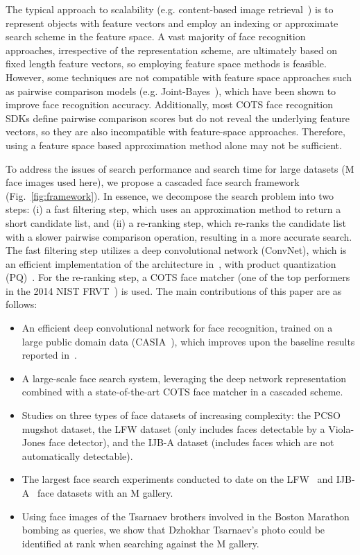 \documentclass[10pt,journal,compsoc]{IEEEtran}
\begin{document}
The typical approach to scalability (e.g. content-based image retrieval~\cite{faceretrieval:wu2010}) is to represent objects with feature vectors and employ an indexing or approximate search scheme in the feature space. A vast majority of face recognition approaches, irrespective of the representation scheme, are ultimately based on fixed length feature vectors, so employing feature space methods is feasible. However, some techniques are not compatible with feature space approaches such as pairwise comparison models (e.g. Joint-Bayes~\cite{ml:jointbayes}), which have been shown to improve face recognition accuracy.  Additionally, most COTS face recognition SDKs define pairwise comparison scores but do not reveal the underlying feature vectors, so they are also incompatible with feature-space approaches. Therefore, using a feature space based approximation method alone may not be sufficient.

To address the issues of search performance and search time for large datasets (M face images used here), we propose a cascaded face search framework (Fig.~\ref{fig:framework}). In essence, we decompose the search problem into two steps: (i) a fast filtering step, which uses an approximation method to return a short candidate list, and (ii) a re-ranking step, which re-ranks the candidate list with a slower pairwise comparison operation, resulting in a more accurate search. The fast filtering step utilizes a deep convolutional network (ConvNet), which is an efficient implementation of the architecture in~\cite{DB:CASIA}, with product quantization (PQ)~\cite{retrieval:pq}. For the re-ranking step, a COTS face matcher (one of the top performers in the 2014 NIST FRVT~\cite{fvrt:2014}) is used. The main contributions of this paper are as follows:
\begin{itemize}
  \item An efficient deep convolutional network for face recognition, trained on a large public domain data (CASIA~\cite{DB:CASIA}), which improves upon the baseline results reported in~\cite{DB:CASIA}.
  \item A large-scale face search system, leveraging the deep network representation combined with a state-of-the-art COTS face matcher in a cascaded scheme.
  \item Studies on three types of face datasets of increasing complexity: the PCSO mugshot dataset, the LFW dataset (only includes faces detectable by a Viola-Jones face detector), and the IJB-A dataset (includes faces which are not automatically detectable).
  \item The largest face search experiments conducted to date on the LFW~\cite{DB:LFWTech} and IJB-A~\cite{db:janus} face datasets with an M gallery.
  \item Using face images of the Tsarnaev brothers involved in the Boston Marathon bombing as queries, we show that Dzhokhar Tsarnaev's photo could be identified at rank  when searching against the M gallery.
\end{itemize}
\end{document}
